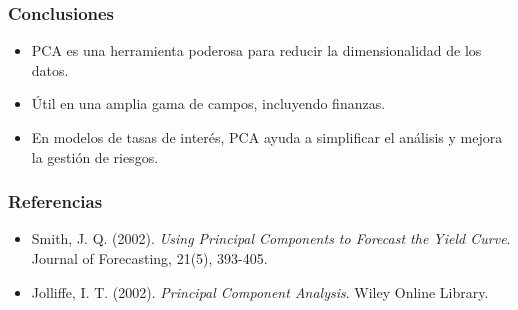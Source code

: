 \documentclass{beamer}
\begin{document}
	\begin{frame}
		\frametitle{Conclusiones}
		\begin{itemize}
			\item PCA es una herramienta poderosa para reducir la dimensionalidad de los datos.
			\item Útil en una amplia gama de campos, incluyendo finanzas.
			\item En modelos de tasas de interés, PCA ayuda a simplificar el análisis y mejora la gestión de riesgos.
		\end{itemize}
	\end{frame}
	
	\begin{frame}
		\frametitle{Referencias}
		\begin{itemize}
			\item Smith, J. Q. (2002). \textit{Using Principal Components to Forecast the Yield Curve}. Journal of Forecasting, 21(5), 393-405.
			\item Jolliffe, I. T. (2002). \textit{Principal Component Analysis}. Wiley Online Library.
		\end{itemize}
	\end{frame}
	
\end{document}
